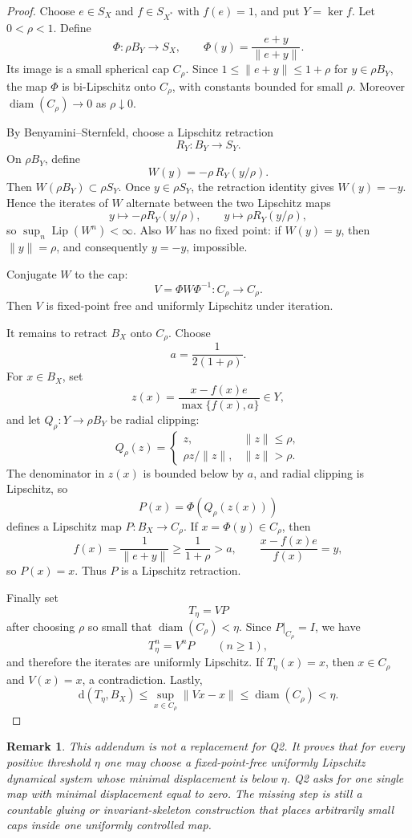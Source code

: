 \documentclass[11pt]{article}
\newtheorem{remark}{Remark}
\newcommand{\Lip}{\operatorname{Lip}}
\begin{document}
\begin{proof}
Choose \(e\in S_X\) and \(f\in S_{X^*}\) with \(f(e)=1\), and put
\(Y=\ker f\).  Let \(0<\rho<1\).  Define
\[
\Phi:\rho B_Y\to S_X,\qquad
\Phi(y)=\frac{e+y}{\|e+y\|}.
\]
Its image is a small spherical cap \(C_\rho\).  Since
\(1\le\|e+y\|\le1+\rho\) for \(y\in\rho B_Y\), the map \(\Phi\) is
bi-Lipschitz onto \(C_\rho\), with constants bounded for small \(\rho\).
Moreover \(\operatorname{diam}(C_\rho)\to0\) as \(\rho\downarrow0\).

By Benyamini--Sternfeld, choose a Lipschitz retraction
\[
R_Y:B_Y\to S_Y.
\]
On \(\rho B_Y\), define
\[
W(y)=-\rho\,R_Y(y/\rho).
\]
Then \(W(\rho B_Y)\subset \rho S_Y\).  Once \(y\in\rho S_Y\), the retraction
identity gives \(W(y)=-y\).  Hence the iterates of \(W\) alternate between the
two Lipschitz maps
\[
y\mapsto -\rho R_Y(y/\rho),
\qquad
y\mapsto \rho R_Y(y/\rho),
\]
so \(\sup_n\Lip(W^n)<\infty\).  Also \(W\) has no fixed point: if
\(W(y)=y\), then \(\|y\|=\rho\), and consequently \(y=-y\), impossible.

Conjugate \(W\) to the cap:
\[
V=\Phi W\Phi^{-1}:C_\rho\to C_\rho .
\]
Then \(V\) is fixed-point free and uniformly Lipschitz under iteration.

It remains to retract \(B_X\) onto \(C_\rho\).  Choose
\[
a=\frac{1}{2(1+\rho)}.
\]
For \(x\in B_X\), set
\[
z(x)=\frac{x-f(x)e}{\max\{f(x),a\}}\in Y,
\]
and let \(Q_\rho:Y\to\rho B_Y\) be radial clipping:
\[
Q_\rho(z)=
\begin{cases}
z, & \|z\|\le\rho,\\
\rho z/\|z\|, & \|z\|>\rho.
\end{cases}
\]
The denominator in \(z(x)\) is bounded below by \(a\), and radial clipping is
Lipschitz, so
\[
P(x)=\Phi(Q_\rho(z(x)))
\]
defines a Lipschitz map \(P:B_X\to C_\rho\).  If \(x=\Phi(y)\in C_\rho\), then
\[
f(x)=\frac{1}{\|e+y\|}\ge\frac{1}{1+\rho}>a,
\qquad
\frac{x-f(x)e}{f(x)}=y,
\]
so \(P(x)=x\).  Thus \(P\) is a Lipschitz retraction.

Finally set
\[
T_\eta=V P
\]
after choosing \(\rho\) so small that \(\operatorname{diam}(C_\rho)<\eta\).
Since \(P|_{C_\rho}=I\), we have
\[
T_\eta^n=V^nP\qquad(n\ge1),
\]
and therefore the iterates are uniformly Lipschitz.  If \(T_\eta(x)=x\), then
\(x\in C_\rho\) and \(V(x)=x\), a contradiction.  Lastly,
\[
\mathrm d(T_\eta,B_X)
\le \sup_{x\in C_\rho}\|Vx-x\|
\le \operatorname{diam}(C_\rho)
<\eta .
\]
\end{proof}

\begin{remark}
This addendum is not a replacement for Q2.  It proves that for every positive
threshold \(\eta\) one may choose a fixed-point-free uniformly Lipschitz
dynamical system whose minimal displacement is below \(\eta\).  Q2 asks for
one single map with minimal displacement equal to zero.  The missing step is
still a countable gluing or invariant-skeleton construction that places
arbitrarily small caps inside one uniformly controlled map.
\end{remark}
\end{document}
